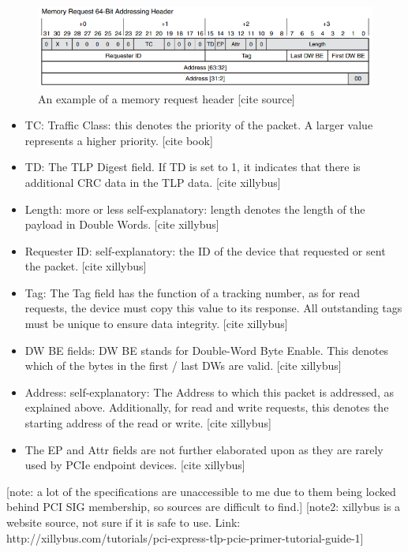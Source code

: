 \begin{figure}
\includegraphics[width = \linewidth]{figures/PCIE-header}
\caption{An example of a memory request header [cite source]}
\label{fig:header}
\end{figure}


\begin{itemize}
\item TC: Traffic Class: this denotes the priority of the packet. A larger value represents a higher priority. [cite book]
\item TD: The TLP Digest field. If TD is set to 1, it indicates that there is additional CRC data in the TLP data. [cite xillybus]
\item Length: more or less self-explanatory: length denotes the length of the payload in Double Words. [cite xillybus]
\item Requester ID: self-explanatory: the ID of the device that requested or sent the packet. [cite xillybus]
\item Tag: The Tag field has the function of a tracking number, as for read requests, the device must copy this value to its response. All outstanding tags must be unique to ensure data integrity. [cite xillybus]
\item DW BE fields: DW BE stands for Double-Word Byte Enable. This denotes which of the bytes in the first / last DWs are valid. [cite xillybus]
\item Address: self-explanatory: The Address to which this packet is addressed, as explained above. Additionally, for read and write requests, this denotes the starting address of the read or write. [cite xillybus]
\item The EP and Attr fields are not further elaborated upon as they are rarely used by PCIe endpoint devices. [cite xillybus]
\end{itemize}



[note: a lot of the specifications are unaccessible to me due to them being locked behind PCI SIG membership, so sources are difficult to find.]
[note2: xillybus is a website source, not sure if it is safe to use. Link: http://xillybus.com/tutorials/pci-express-tlp-pcie-primer-tutorial-guide-1]

